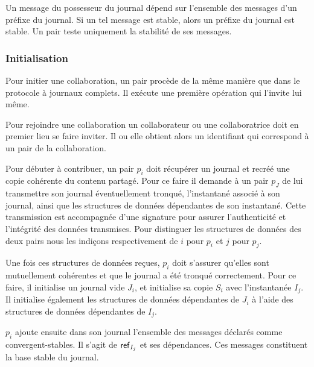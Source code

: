Un message du possesseur du journal dépend sur l'ensemble des messages d'un préfixe du journal.
Si un tel message est stable, alors un préfixe du journal est stable.
Un pair teste uniquement la stabilité de ses messages.


\subsubsection{Initialisation}

Pour initier une collaboration, un pair procède de la même manière que dans le protocole à journaux complets.
Il exécute une première opération qui l'invite lui même.

Pour rejoindre une collaboration un collaborateur ou une collaboratrice doit en premier lieu se faire inviter.
Il ou elle obtient alors un identifiant qui correspond à un pair de la collaboration.

Pour débuter à contribuer, un pair $p_i$ doit récupérer un journal et recréé une copie cohérente du contenu partagé.
Pour ce faire il demande à un pair $p_J$ de lui transmettre son journal éventuellement tronqué, l'instantané associé à son journal, ainsi que les structures de données dépendantes de son instantané.
Cette transmission est accompagnée d'une signature pour assurer l'authenticité et l'intégrité des données transmises.
Pour distinguer les structures de données des deux pairs nous les indiçons respectivement de $i$ pour $p_i$ et $j$ pour $p_j$.

%
%

Une fois ces structures de données reçues, $p_i$ doit s'assurer qu'elles sont mutuellement cohérentes et que le journal a été tronqué correctement.
Pour ce faire, il initialise un journal vide $J_i$, et initialise sa copie $S_i$ avec l'instantanée $I_j$.
Il initialise également les structures de données dépendantes de $J_i$ à l'aide des structures de données dépendantes de $I_j$.

$p_i$ ajoute ensuite dans son journal l'ensemble des messages déclarés comme convergent-stables.
Il s'agit de $\operatorname{\mathsf{ref}}_{I_j}$ et ses dépendances.
Ces messages constituent la base stable du journal.

